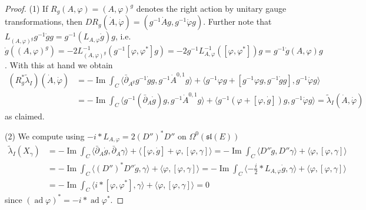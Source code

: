 \documentclass[12pt,letterpaper,reqno]{amsart}
\theoremstyle{remark}
\theoremstyle{definition}
\numberwithin{thm}{section}
\numberwithin{equation}{section}
\numberwithin{figure}{section}
\DeclareMathOperator{\ad}{ad}
\DeclareMathOperator{\im}{Im}
\begin{document}
\begin{proof}
(1) If $R_g(A,\varphi)=(A,\varphi)^g$ denotes the right action by unitary gauge transformations, then $DR_g(\dot A,\dot \varphi) = (g^{-1}\dot A g, g^{-1}\dot \varphi g)$. Further note that $L_{(A,\varphi)^g} g^{-1}\dot g g = g^{-1}(L_{A,\varphi}\dot g)g$, i.e.\ $\dot g((A,\varphi)^g) = -2 L_{(A,\varphi)^g}^{-1}(g^{-1}[ \varphi, \varphi^*]g) = -2 g^{-1}L_{A,\varphi}^{-1}([\varphi,\varphi^*]) g =g^{-1} \dot g(A,\varphi) g$. With this at hand we obtain
\begin{align*}
(R_g^*\tilde\lambda_I) (\dot A, \dot \varphi)  &= - \im\int_C \langle  \bar\partial_{A^g} g^{-1}\dot g g ,g^{-1}\dot A^{0,1} g \rangle + \langle g^{-1} \varphi g + [g^{-1}\varphi g, g^{-1} \dot g g], g^{-1}\dot \varphi g \rangle\\
&=- \im \int_C \langle g^{-1} (\bar\partial_{A} \dot g)g  ,g^{-1}\dot A^{0,1} g \rangle + \langle g^{-1} (\varphi  + [\varphi,  \dot g ] )g, g^{-1}\dot \varphi g \rangle = \tilde\lambda_I(\dot A,\dot \varphi)
\end{align*}
as claimed.

(2) We compute using $- i \ast L_{A,\varphi} =2(D'')^*D''$ on $\Omega^0(\mathfrak{sl}(E))$ 
\begin{align*}
\tilde\lambda_I(X_\gamma) &= - \im \int_C  \langle \bar\partial_A \dot g, \bar\partial_A \gamma \rangle + \langle [\varphi, \dot g] + \varphi , [\varphi, \gamma] \rangle   = - \im \int_C  \langle D'' \dot g, D'' \gamma \rangle  +\langle \varphi, [\varphi, \gamma] \rangle \\
& = - \im \int_C  \langle  (D'')^*D'' \dot g,  \gamma \rangle  +\langle \varphi, [\varphi, \gamma] \rangle = - \im \int_C \langle - \frac{i}{2} \ast L_{A,\varphi} \dot g, \gamma \rangle + \langle \varphi, [\varphi, \gamma] \rangle \\
& = - \im \int_C \langle i \ast [\varphi,\varphi^*] , \gamma\rangle + \langle \varphi, [\varphi, \gamma] \rangle = 0
\end{align*}
since  $(\ad \varphi)^* = - i \ast\ad \varphi^*$.


\end{proof}
\end{document}

